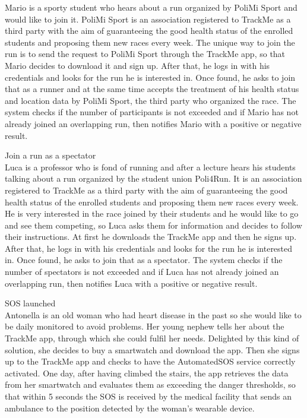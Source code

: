 \documentclass{article}
\begin{document}
\begin{legal}
\begin{legal}
\begin{legal}
{\begin{legal}
Mario is a sporty student who hears about a run organized by PoliMi Sport and would like to join it. PoliMi Sport is an association registered to TrackMe as a third party with the aim of guaranteeing the good health status of the enrolled students and proposing them new races every week. The unique way to join the run is to send the request to PoliMi Sport through the TrackMe app, so that Mario decides to download it and sign up. After that, he logs in with his credentials and looks for the run he is interested in. Once found, he asks to join that as a runner and at the same time accepts the treatment of his health status and location data by PoliMi Sport, the third party who organized the race. The system checks if the number of participants is not exceeded and if Mario has not already joined an overlapping run, then notifies Mario with a positive or negative result.\\

\item Join a run as a spectator\\

Luca is a professor who is fond of running and after a lecture hears his students talking about a run organized by the student union Poli4Run. It is an association registered to TrackMe as a third party with the aim of guaranteeing the good health status of the enrolled students and proposing them new races every week. He is very interested in the race joined by their students and he would like to go and see them competing, so Luca asks them for information and decides to follow their instructions. At first he downloads the TrackMe app and then he signs up. After that, he logs in with his credentials and looks for the run he is interested in. Once found, he asks to join that as a spectator. The system checks if the number of spectators is not exceeded and if Luca has not already joined an overlapping run, then notifies Luca with a positive or negative result.\\


\item SOS launched\\

Antonella is an old woman who had heart disease in the past so she would like to be daily monitored to avoid problems. Her young nephew tells her about the TrackMe app, through which she could fulfil her needs. Delighted by this kind of solution, she decides to buy a smartwatch and download the app. Then she signs up to the TrackMe app and checks to have the AutomatedSOS service correctly activated. One day, after having climbed the stairs, the app retrieves the data from her smartwatch and evaluates them as exceeding the danger thresholds, so that within 5 seconds the SOS is received by the medical facility that sends an ambulance to the position detected by the woman’s wearable device.\\



\end{legal}}
\end{legal}
\end{legal}
\end{legal}
\end{document}
